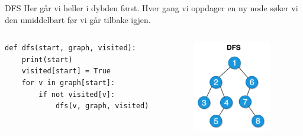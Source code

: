 \begin{frame}[fragile]{DFS}
    Her går vi heller i dybden først. Hver gang vi oppdager en ny node søker vi den umiddelbart før vi går tilbake igjen.
    \begin{columns}
        \begin{column}{0.5\textwidth}
            \begin{verbatim}
def dfs(start, graph, visited):
    print(start)
    visited[start] = True
    for v in graph[start]:
        if not visited[v]:
            dfs(v, graph, visited)
            \end{verbatim}
        \end{column}
        \begin{column}{0.45\textwidth}
            \begin{figure}
                \centering
                \includegraphics[height=4cm]{images/dfs.png}
                \label{fig:bfs}
            \end{figure}   
        \end{column}
    \end{columns}
\end{frame}


